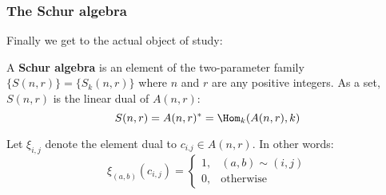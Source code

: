 \documentclass[12pt]{article}
\begin{document}
\subsubsection{The Schur algebra}
Finally we get to the actual object of study:
\begin{defn}\label{def:schur-alg}
	A \textbf{Schur algebra} is an element of the two-parameter family $\{S(n,r)\}=\{S_k(n,r)\}$ where $n$ and $r$ are any positive integers.
	As a set, $S(n,r)$ is the linear dual of $A(n,r)$:
	\[S(n,r)=A(n,r)^\ast=\Hom_k(A(n,r),k)\] 

	Let $\xi_{i,j}$ denote the element dual to $c_{i.j}\in A(n,r)$. In other words:
	\[\xi_{(a,b)}(c_{i,j})=\begin{cases}
		1, & (a,b)\sim(i,j)\\
		0, & \text{otherwise}
	\end{cases}\]
\end{defn}
\end{document}
